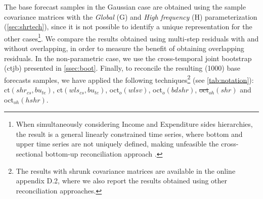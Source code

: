 \documentclass[review, 11pt]{elsarticle}
\theoremstyle{definition}
\begin{document}
The base forecast samples in the Gaussian case are obtained using the sample covariance matrices with the \textit{Global} (G) and \textit{High frequency} (H) parameterization (\autoref{sec:shrtech}), since it is not possible to identify a unique representation for the other cases\footnote{When simultaneously considering Income and Expenditure sides hierarchies, the result is a general linearly constrained time series, where bottom and upper time series are not uniquely defined, making unfeasible the cross-sectional bottom-up reconciliation approach \citep{giro2022}.}. We compare the results obtained using multi-step residuals with and without overlapping, in order to measure the benefit of obtaining overlapping residuals. In the non-parametric case, we use the cross-temporal joint bootstrap (ctjb) presented in \autoref{ssec:boot}. Finally, to reconcile the resulting (1000) base forecasts samples, we have applied the following techniques\footnote{\color{blue}The results with shrunk covariance matrices are available in the online appendix D.2, where we also report the results obtained using other reconciliation approaches.} (see \autoref{tab:notation}): ct$(shr_{cs}, bu_{te})$, ct$(wls_{cs}, bu_{te})$, oct$_o(wlsv)$, oct$_o(bdshr)$, {\color{red}\sout{oct$_{oh}(shr)$}} and oct$_{oh}(hshr)$.
\end{document}
